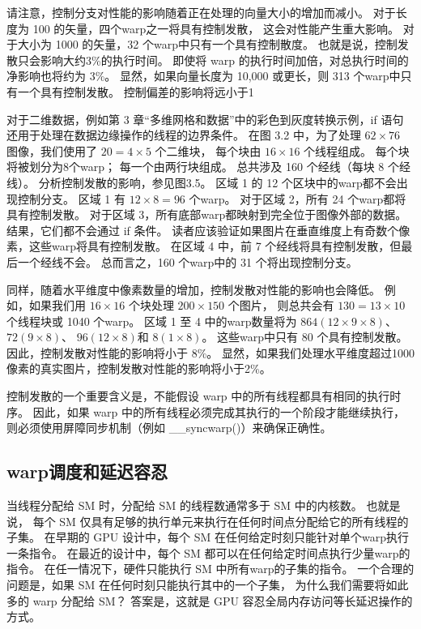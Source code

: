 请注意，控制分支对性能的影响随着正在处理的向量大小的增加而减小。 对于长度为 100 的矢量，四个warp之一将具有控制发散，
这会对性能产生重大影响。 对于大小为 1000 的矢量，32 个warp中只有一个具有控制散度。 
也就是说，控制发散只会影响大约3\%的执行时间。 即使将 warp 的执行时间加倍，对总执行时间的净影响也将约为 3\%。 
显然，如果向量长度为 10,000 或更长，则 313 个warp中只有一个具有控制发散。 控制偏差的影响将远小于1%

对于二维数据，例如第 3 章“多维网格和数据”中的彩色到灰度转换示例，if 语句还用于处理在数据边缘操作的线程的边界条件。 
在图 3.2 中，为了处理 $62 \times 76$ 图像，我们使用了 $20 = 4 \times 5$ 个二维块，
每个块由 $16 \times 16$ 个线程组成。 
每个块将被划分为8个warp； 每一个由两行块组成。 总共涉及 160 个经线（每块 8 个经线）。 分析控制发散的影响，参见图3.5。 
区域 1 的 12 个区块中的warp都不会出现控制分支。 区域 1 有 $12 \times 8 = 96$ 个warp。
对于区域 2，所有 24 个warp都将具有控制发散。 对于区域 3，所有底部warp都映射到完全位于图像外部的数据。 
结果，它们都不会通过 if 条件。 读者应该验证如果图片在垂直维度上有奇数个像素，这些warp将具有控制发散。 
在区域 4 中，前 7 个经线将具有控制发散，但最后一个经线不会。 总而言之，160 个warp中的 31 个将出现控制分支。

同样，随着水平维度中像素数量的增加，控制发散对性能的影响也会降低。 
例如，如果我们用 $16 \times 16$ 个块处理 $200 \times 150$ 个图片，
则总共会有 $130 = 13 \times 10$ 个线程块或 1040 个warp。 
区域 1 至 4 中的warp数量将为 $864(12 \times 9 \times 8)$、$72(9 \times 8)$、
$96 (12 \times 8)$和 $8(1 \times 8)$。 
这些warp中只有 80 个具有控制发散。 因此，控制发散对性能的影响将小于 8\%。 
显然，如果我们处理水平维度超过1000像素的真实图片，控制发散对性能的影响将小于2\%。

控制发散的一个重要含义是，不能假设 warp 中的所有线程都具有相同的执行时序。 
因此，如果 warp 中的所有线程必须完成其执行的一个阶段才能继续执行，
则必须使用屏障同步机制（例如 \_\_syncwarp()）来确保正确性。

\subsection{warp调度和延迟容忍}
当线程分配给 SM 时，分配给 SM 的线程数通常多于 SM 中的内核数。 也就是说，
每个 SM 仅具有足够的执行单元来执行在任何时间点分配给它的所有线程的子集。 
在早期的 GPU 设计中，每个 SM 在任何给定时刻只能针对单个warp执行一条指令。 
在最近的设计中，每个 SM 都可以在任何给定时间点执行少量warp的指令。 
在任一情况下，硬件只能执行 SM 中所有warp的子集的指令。 一个合理的问题是，如果 SM 在任何时刻只能执行其中的一个子集，
为什么我们需要将如此多的 warp 分配给 SM？ 答案是，这就是 GPU 容忍全局内存访问等长延迟操作的方式。

